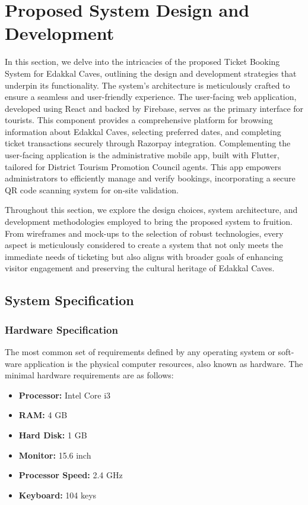 \documentclass[12pt,a4paper]{report}
\begin{document}
\clearpage
\chapter{Proposed System Design and Development}

In this section, we delve into the intricacies of the proposed Ticket Booking System for Edakkal Caves, outlining the design and development strategies that underpin its functionality. The system's architecture is meticulously crafted to ensure a seamless and user-friendly experience. The user-facing web application, developed using React and backed by Firebase, serves as the primary interface for tourists. This component provides a comprehensive platform for browsing information about Edakkal Caves, selecting preferred dates, and completing ticket transactions securely through Razorpay integration. Complementing the user-facing application is the administrative mobile app, built with Flutter, tailored for District Tourism Promotion Council agents. This app empowers administrators to efficiently manage and verify bookings, incorporating a secure QR code scanning system for on-site validation.

Throughout this section, we explore the design choices, system architecture, and development methodologies employed to bring the proposed system to fruition. From wireframes and mock-ups to the selection of robust technologies, every aspect is meticulously considered to create a system that not only meets the immediate needs of ticketing but also aligns with broader goals of enhancing visitor engagement and preserving the cultural heritage of Edakkal Caves.

\section{System Specification}

\subsection{Hardware Specification}
The most common set of requirements defined by any operating system or soft- ware application is the physical computer resources, also known as hardware. The minimal hardware requirements are as follows:

\begin{itemize}
    \item \textbf{Processor:} Intel Core i3
    \item \textbf{RAM:} 4 GB
    \item \textbf{Hard Disk:} 1 GB
    \item \textbf{Monitor:} 15.6 inch
    \item \textbf{Processor Speed:} 2.4 GHz
    \item \textbf{Keyboard:} 104 keys
\end{itemize}
\end{document}
